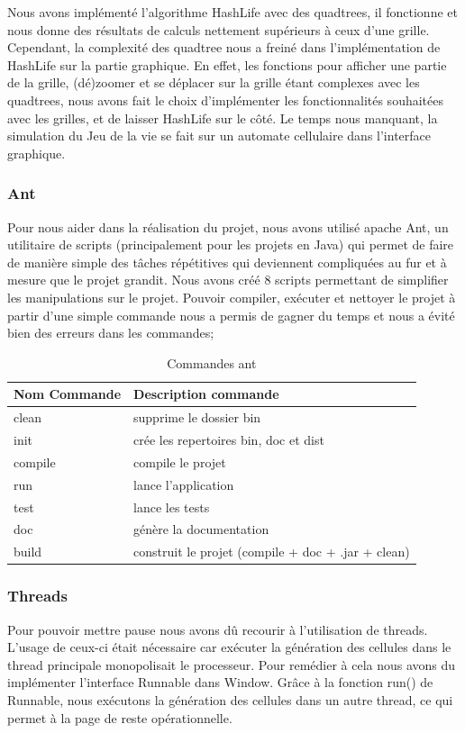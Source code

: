 \documentclass[12pt]{article}
\begin{document}
			Nous avons implémenté l’algorithme HashLife avec des quadtrees, il fonctionne et nous donne des résultats de calculs nettement supérieurs à ceux d’une grille. Cependant, la complexité des quadtree nous a freiné dans l’implémentation de HashLife sur la partie graphique. En effet, les fonctions pour afficher une partie de la grille, (dé)zoomer et se déplacer sur la grille étant complexes avec les quadtrees, nous avons fait le choix d’implémenter les fonctionnalités souhaitées avec les grilles, et de laisser HashLife sur le côté. Le temps nous manquant, la simulation du Jeu de la vie se fait sur un automate cellulaire dans l’interface graphique.
			
			
			\subsubsection{Ant}
			Pour nous aider dans la réalisation du projet, nous avons utilisé apache Ant, un utilitaire de scripts (principalement pour les projets en Java) qui permet de faire de manière simple des tâches répétitives qui deviennent compliquées au fur et à mesure que le projet grandit. Nous avons créé 8 scripts permettant de simplifier les manipulations sur le projet. Pouvoir compiler, exécuter et nettoyer le projet à partir d'une simple commande nous a permis de gagner du temps et nous a évité bien des erreurs dans les commandes;
			\begin{table}[!htpb]
				\center
				\begin{tabular}{|l|l|}
					\hline
					\textbf{Nom Commande} & \textbf{Description commande} \\
					\hline
					clean & supprime le dossier bin \\
					\hline
					init & crée les repertoires bin, doc et dist \\
					\hline
					compile & compile le projet \\
					\hline
					run & lance l'application \\
					\hline
					test & lance les tests \\
					\hline
					doc & génère la documentation \\
					\hline
					build & construit le projet (compile + doc + .jar + clean) \\
					\hline
				\end{tabular}
				\caption{Commandes ant}
				\label{tab1}
			\end{table}
			
			\subsubsection{Threads}
			Pour pouvoir mettre pause nous avons dû recourir à l’utilisation de threads. L’usage de ceux-ci était nécessaire car exécuter la génération des cellules dans le thread principale monopolisait le processeur. Pour remédier à cela nous avons du implémenter l’interface Runnable dans Window. Grâce à la fonction run() de Runnable, nous exécutons la génération des cellules dans un autre thread, ce qui permet à la page de reste opérationnelle. 
			
\end{document}

